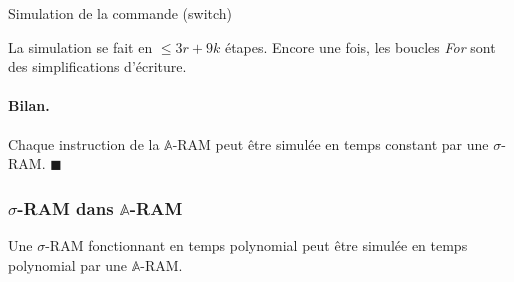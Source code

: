 \documentclass{report}
\newcommand{\bbA}{\mathbb{A}}
\begin{document}
\begin{demo}
\begin{algorithm}[H]
						\caption{Simulation de la commande (switch)}
					\end{algorithm}
					
					\espace 
					
					La simulation se fait en $\leq 3r + 9k$ étapes. Encore une fois, les boucles \emph{For} sont des simplifications d'écriture. 
				
					\paragraph{Bilan.}
					Chaque instruction de la $\bbA$-RAM peut être simulée en temps constant par une $\sigma$-RAM. $\blacksquare$
				\end{demo}
	
	
				\subsubsection{$\sigma$-RAM dans $\bbA$-RAM}
				\label{subsubsec:sim_sigma_RAM_A_RAM}
				
				
				\begin{lemma}
					\label{lem:sim_sigma_RAM_A_RAM}
					Une $\sigma$-RAM fonctionnant en temps polynomial peut être simulée en temps polynomial par une $\bbA$-RAM.
				\end{lemma}
	
\end{document}
